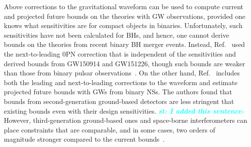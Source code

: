 \documentclass[prd,twocolumn,nofootinbib]{revtex4-1}
\newcommand{\KG}{{\mbox{\tiny kh}}}
\newcommand{\st}[1]{\textcolor{cyan}{\it{\textbf{st: #1}}} }
\begin{document}
Above corrections to the gravitational waveform can be used to compute current and projected future bounds on the theories with GW observations, provided one knows what sensitivities are for compact objects in binaries. Unfortunately, such sensitivities have not been calculated for BHs, and hence, one cannot derive bounds on the theories from recent binary BH merger events. Instead, Ref.~\cite{Yunes:2016jcc} used the next-to-leading 0PN correction that is independent of the sensitivities and derived bounds from GW150914 and GW151226, though such bounds are weaker than those from binary pulsar observations~\cite{Yagi:2013ava,Yagi:2013qpa}. On the other hand, Ref.~\cite{Hansen:2014ewa} includes both the leading and next-to-leading corrections to the waveform and estimate projected future bounds with GWs from binary NSs. The authors found that bounds from second-generation ground-based detectors are less stringent that existing bounds even with their design sensitivities.
\st{I added this sentence-}
However, third-generation ground-based ones and space-borne interferometers can place constraints that are comparable, and in some cases, two orders of magnitude stronger compared to the current bounds~\cite{Chamberlain:2017fjl,Hansen:2014ewa}.
  
\end{document}

